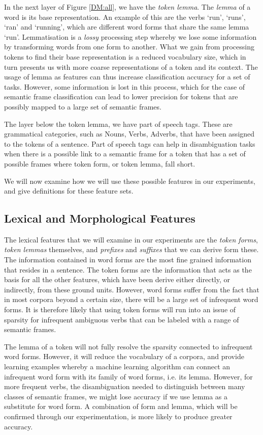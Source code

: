 In the next layer of Figure \ref{DM:all}, we have the \textit{token lemma}. The \textit{lemma} of a word is its base representation. An example of this are the verbs `run', `runs', `ran' and `running', which are different word forms that share the same lemma `run'. Lemmatisation is a \textit{lossy} processing step whereby we lose some information by transforming words from one form to another. What we gain from processing tokens to find their base representation is a reduced vocabulary size, which in turn presents us with more coarse representations of a token and its context. The usage of lemma as features can thus increase classification accuracy for a set of tasks. However, some information is lost in this process, which for the case of semantic frame classification can lead to lower precision for tokens that are possibly mapped to a large set of semantic frames.

The layer below the token lemma, we have part of speech tags. These are grammatical categories, such as Nouns, Verbs, Adverbs, that have been assigned to the tokens of a sentence. Part of speech tags can help in disambiguation tasks when there is a possible link to a semantic frame for a token that has a set of possible frames where token form, or token lemma, fall short.

We will now examine how we will use these possible features in our experiments, and give definitions for these feature sets.

\subsection{Lexical and Morphological Features}

The lexical features that we will examine in our experiments are the \textit{token forms}, \textit{token lemmas} themselves, and \textit{prefixes} and \textit{suffixes} that we can derive form these. The information contained in word forms are the most fine grained information that resides in a sentence. The token forms are the information that acts as the basis for all the other features, which have been derive either directly, or indirectly, from these ground units. However, word forms suffer from the fact that in most corpora beyond a certain size, there will be a large set of infrequent word forms. It is therefore likely that using token forms will run into an issue of sparsity for infrequent ambiguous verbs that can be labeled with a range of semantic frames.

The lemma of a token will not fully resolve the sparsity connected to infrequent word forms. However, it will reduce the vocabulary of a corpora, and provide learning examples whereby a machine learning algorithm can connect an infrequent word form with its family of word forms, i.e. its lemma. However, for more frequent verbs, the disambiguation needed to distinguish between many classes of semantic frames, we might lose accuracy if we use lemma as a substitute for word form. A combination of form and lemma, which will be confirmed through our experimentation, is more likely to produce greater accuracy.

